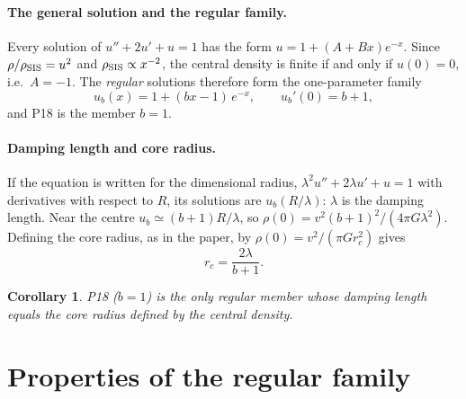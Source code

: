\documentclass[11pt,a4paper]{article}
\newtheorem{corollary}{Corollary}
\theoremstyle{remark}
\newcommand{\rc}{r_c}
\begin{document}
\paragraph{The general solution and the regular family.} Every solution of
$u''+2u'+u=1$ has the form $u=1+(A+Bx)e^{-x}$. Since $\rho/\rho_{\rm SIS}=u^2$ and
$\rho_{\rm SIS}\propto x^{-2}$, the central density is finite if and only if $u(0)=0$,
i.e.\ $A=-1$. The \emph{regular} solutions therefore form the one-parameter family
\begin{equation}
  u_b(x)=1+(bx-1)\,e^{-x},\qquad u_b'(0)=b+1,
  \label{eq:family}
\end{equation}
and P18 is the member $b=1$.

\paragraph{Damping length and core radius.} If the equation is written for the
dimensional radius, $\lambda^2u''+2\lambda u'+u=1$ with derivatives with respect to
$R$, its solutions are $u_b(R/\lambda)$: $\lambda$ is the damping length. Near the
centre $u_b\simeq(b+1)R/\lambda$, so
$\rho(0)=v^2(b+1)^2/(4\pi G\lambda^2)$. Defining the core radius, as in the paper,
by $\rho(0)=v^2/(\pi G\rc^2)$ gives
\begin{equation}
  \rc=\frac{2\lambda}{b+1}.
\end{equation}
\begin{corollary}
P18 ($b=1$) is the only regular member whose damping length equals the core radius
defined by the central density.
\end{corollary}

\section{Properties of the regular family}\label{sec:props}
\end{document}
